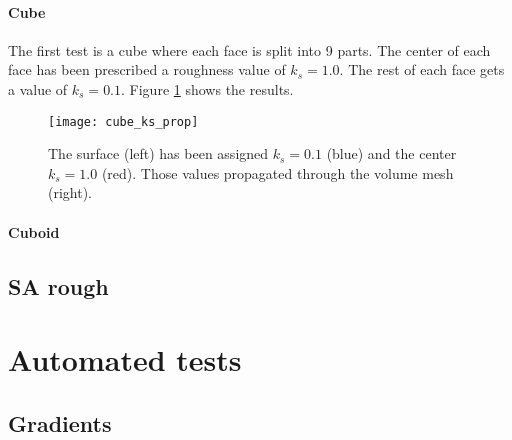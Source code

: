 \paragraph{Cube}
The first test is a cube where each face is split into 9 parts. The center of
each face has been prescribed a roughness value of $k_{s} = 1.0$. The rest of
each face gets a value of $k_{s} = 0.1$. Figure \ref{fig:cube_ks_prop} shows the
results.

\begin{figure}[H] \centering
\texttt{[image: cube\_ks\_prop]}
    \caption{The surface (left) has been assigned $k_{s} = 0.1$ (blue) and the
center $k_{s} = 1.0$ (red). Those values propagated through the volume mesh
(right).}
    \label{fig:cube_ks_prop}
\end{figure}

\paragraph{Cuboid}


\subsection{SA rough}

\section{Automated tests}

\subsection{Gradients}
